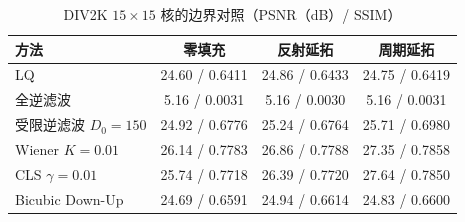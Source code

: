 \begin{table}[htbp]
\centering
\caption{DIV2K $ 15\times15$ 核的边界对照（PSNR（dB）/ SSIM）}
\label{tab:div15}
\begin{tabular}{lccc}
\toprule
方法 & 零填充 & 反射延拓 & 周期延拓 \\
\midrule
LQ & 24.60 / 0.6411 & 24.86 / 0.6433 & 24.75 / 0.6419 \\
全逆滤波 & 5.16 / 0.0031 & 5.16 / 0.0030 & 5.16 / 0.0031 \\
受限逆滤波 $D_0=150$ & 24.92 / 0.6776 & 25.24 / 0.6764 & 25.71 / 0.6980 \\
Wiener $K=0.01$ & 26.14 / 0.7783 & 26.86 / 0.7788 & 27.35 / 0.7858 \\
CLS $\gamma=0.01$ & 25.74 / 0.7718 & 26.39 / 0.7720 & 27.64 / 0.7850 \\
Bicubic Down-Up & 24.69 / 0.6591 & 24.94 / 0.6614 & 24.83 / 0.6600 \\
\bottomrule
\end{tabular}
\end{table}
